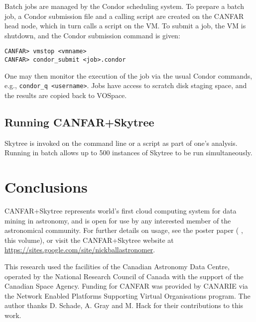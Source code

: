 Batch jobs are managed by the Condor scheduling system. To prepare a batch job, a Condor submission file and a calling script are created on the CANFAR head node, which in turn calls a script on the VM. To submit a job, the VM is shutdown, and the Condor submission command is given:

\begin{verbatim}
CANFAR> vmstop <vmname>
CANFAR> condor_submit <job>.condor
\end{verbatim}

One may then monitor the execution of the job via the usual Condor commands, e.g., {\tt condor\_q <username>}. Jobs have access to scratch disk staging space, and the results are copied back to VOSpace.

\subsection{Running CANFAR+Skytree}

Skytree is invoked on the command line or a script as part of one's analysis. Running in batch allows up to 500 instances of Skytree to be run simultaneously.

\section{Conclusions}

CANFAR+Skytree represents world's first cloud computing system for data mining in astronomy, and is open for use by any interested member of the astronomical community. For further details on usage, see the poster paper (\citeauthor{ball:adass12poster} \citeyear{ball:adass12poster}, this volume), or visit the CANFAR+Skytree website at\\ \url{https://sites.google.com/site/nickballastronomer}.

\acknowledgements This research used the facilities of the Canadian Astronomy Data Centre, operated by the National Research Council of Canada with the support of the Canadian Space Agency. Funding for CANFAR was provided by CANARIE via the Network Enabled Platforms Supporting Virtual Organisations program. The author thanks D. Schade, A. Gray and M. Hack for their contributions to this work.



